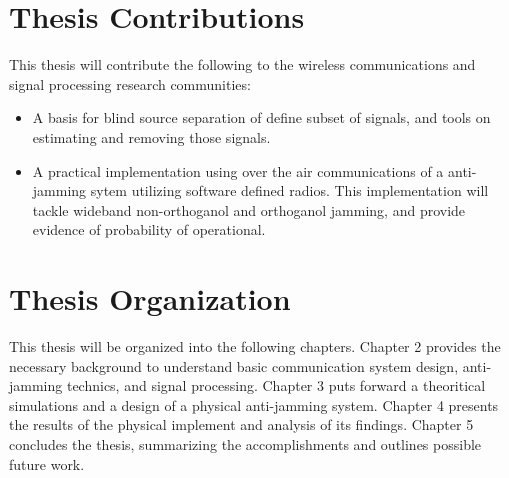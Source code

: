 \section{Thesis Contributions}

This thesis will contribute the following to the wireless communications and signal processing research communities:

\begin{itemize}
\item A basis for blind source separation of define subset of signals, and tools on estimating and removing those signals.

\item A practical implementation using over the air communications of a anti-jamming sytem utilizing software defined radios. This implementation will tackle wideband non-orthoganol and orthoganol jamming, and provide evidence of probability of operational.
\end{itemize}


\section{Thesis Organization}

This thesis will be organized into the following chapters.  Chapter 2 provides the necessary background to understand basic communication system design, anti-jamming technics, and signal processing.  Chapter 3 puts forward a theoritical simulations and a design of a physical anti-jamming system.  Chapter 4 presents the results of the physical implement and analysis of its findings.  Chapter 5 concludes the thesis, summarizing the accomplishments and outlines possible future work.
